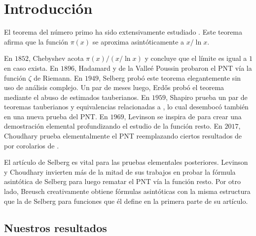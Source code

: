 \setlength{\headheight}{14.61858pt}
\pagestyle{fancy}

\chapter[Introducci\'on]
{Introducci\'on}
\label{ch:introduction}

\vspace*{1cm}

El teorema del n\'umero primo ha sido extensivamente estudiado
\cite{
  Breusch1960,
  Choudhary2017,
  Diamond1982,
  Erdos1949,
  Levinson1969,
  Liu2022,
  Newman1980,
  Richter2021,
  Selberg1949,
  Shapiro1959}.
Este teorema afirma que la funci\'on \(\pi(x)\) se aproxima
asint\'oticamente a \(x / \ln x\).

En \(1852\), Chebyshev \cite{Chebyshev1852} acota \(\pi(x) / (x / \ln x)\)
y concluye que el l\'imite es igual a \(1\) en caso exista.
En \(1896\), Hadamard \cite{Hadamard1896} y de la Valle\'e Poussin
probaron el PNT v\'ia la funci\'on \(\zeta\) de Riemann.
En \(1949\), Selberg \cite{Selberg1949}
prob\'o este teorema elegantemente sin uso de an\'alisis complejo.
Un par de meses luego, Erdős \cite{Erdos1949}
prob\'o el teorema mediante el abuso de estimados tauberianos.
En \(1959\), Shapiro \cite{Shapiro1959}
prueba un par de teoremas tauberianos y equivalencias relacionadas a \cite{Erdos1949},
lo cual desemboc\'o tambi\'en en una nueva prueba del PNT.
En \(1969\), Levinson \cite{Levinson1969} se inspira de \cite{Selberg1949, Breusch1960}
para crear una demostraci\'on elemental
profundizando el estudio de la funci\'on resto.
En \(2017\), Choudhary \cite{Choudhary2017} prueba elementalmente el PNT
reemplazando ciertos resultados de \cite{Levinson1969}
por corolarios de \cite{Shapiro1959}.

El art\'iculo de Selberg es vital para las pruebas elementales posteriores.
Levinson y Choudhary invierten más de la mitad de sus trabajos en
probar la f\'ormula asint\'otica de Selberg para luego rematar
el PNT v\'ia la funci\'on resto.
Por otro lado, Breusch creativamente obtiene
f\'ormulas asint\'oticas con la misma estructura que la de Selberg
para funciones que \'el define en la primera parte de su art\'iculo.

\section{Nuestros resultados}

